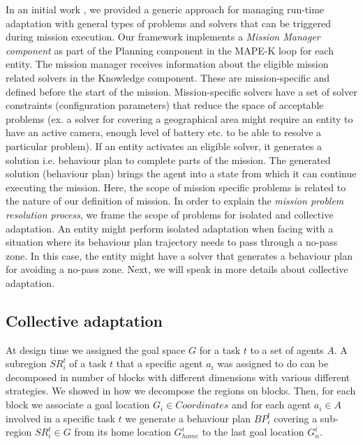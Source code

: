 \documentclass[journal]{IEEEtran}
\theoremstyle{definition}
\newcommand\darko[1]{\nb{Darko}{#1}}
\begin{document}
 

 
 
 

 
In an initial work \cite{bozhinoski2016leveraging}, we provided a generic approach for managing run-time adaptation with general types of problems and solvers that can be triggered during mission execution.
Our framework implements a \textit{Mission Manager component} as part of the Planning component in the MAPE-K loop for each entity. 
 The mission manager receives information about the eligible mission related solvers in the Knowledge component. These are mission-specific and defined before the start of the mission. Mission-specific solvers have a set of solver constraints (configuration parameters) that reduce the space of acceptable problems (ex. a solver for covering a geographical area might require an entity to have an active camera, enough level of battery etc. to be  able to resolve a particular problem).  If an entity %
 activates an eligible solver, it generates a solution i.e. behaviour plan to complete parts of the mission.
 The generated solution (behaviour plan) brings the agent into a state from which it can continue executing the mission.
 Here, the scope of mission specific problems is related to the nature of our definition of mission. In order to explain the \textit{mission problem resolution process}, we frame the scope of problems for isolated and collective adaptation.
 An entity might perform isolated adaptation when facing with a situation where its behaviour plan trajectory needs to pass through a no-pass zone. In this case, the entity might have a solver that generates a behaviour plan for avoiding a no-pass zone. Next, we will speak in more details about collective adaptation.

\subsection{Collective adaptation}
At design time we assigned the goal space $G$ for a task $t$ to a set of agents $A$. A subregion $SR^t_i$ of a task $t$ that a specific agent $a_i$  was assigned to do can be decomposed in number of blocks with different dimensions with various different strategies. We showed in \cite{bozhinoski2015flyaq, di2013engineering} how we decompose the regions on blocks. Then, for each block we associate a goal location $G_i \in Coordinates$ and for each agent $a_i \in A$ involved in a specific task $t$ we generate a  behaviour plan $BP^t_i$ covering a sub-region $SR^t_i \in G$ from its home location $G^i_{home}$ to the last goal location $G^i_n$.
\end{document}
